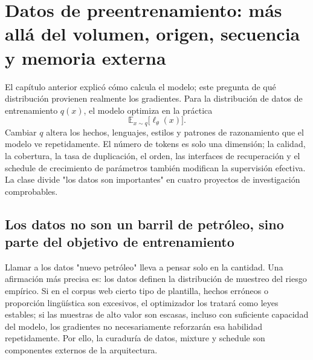 \section{Datos de preentrenamiento: más allá del volumen, origen, secuencia y memoria externa}

El capítulo anterior explicó cómo calcula el modelo; este pregunta de qué distribución provienen realmente los gradientes. Para la distribución de datos de entrenamiento $q(x)$, el modelo optimiza en la práctica
\[
\mathbb{E}_{x\sim q}\big[\ell_{\theta}(x)\big].
\]
Cambiar $q$ altera los hechos, lenguajes, estilos y patrones de razonamiento que el modelo ve repetidamente. El número de tokens es solo una dimensión; la calidad, la cobertura, la tasa de duplicación, el orden, las interfaces de recuperación y el schedule de crecimiento de parámetros también modifican la supervisión efectiva. La clase divide "los datos son importantes" en cuatro proyectos de investigación comprobables.

\subsection{Los datos no son un barril de petróleo, sino parte del objetivo de entrenamiento}

Llamar a los datos "nuevo petróleo" lleva a pensar solo en la cantidad. Una afirmación más precisa es: los datos definen la distribución de muestreo del riesgo empírico. Si en el corpus web cierto tipo de plantilla, hechos erróneos o proporción lingüística son excesivos, el optimizador los tratará como leyes estables; si las muestras de alto valor son escasas, incluso con suficiente capacidad del modelo, los gradientes no necesariamente reforzarán esa habilidad repetidamente. Por ello, la curaduría de datos, mixture y schedule son componentes externos de la arquitectura.





